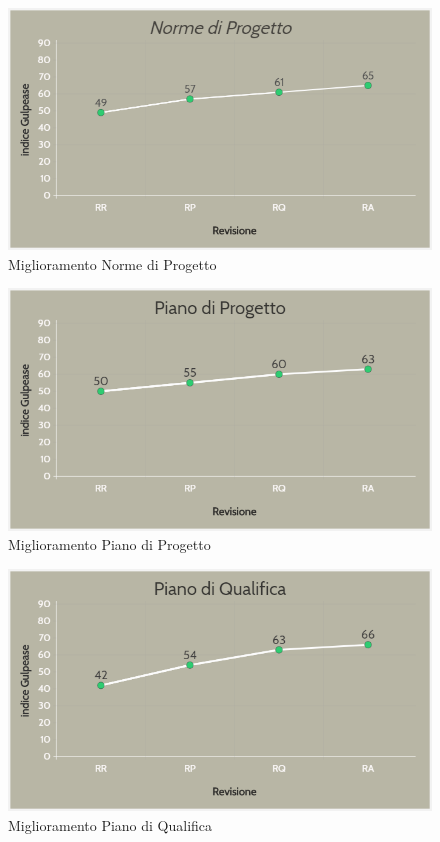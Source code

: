 \begin{figure}[H]
	\centering
	\includegraphics[scale=0.6]{includes/img/NdP.png}
	\caption{Miglioramento Norme di Progetto}
\end{figure}

\begin{figure}[H]
	\centering
	\includegraphics[scale=0.6]{includes/img/PdP.png}
	\caption{Miglioramento Piano di Progetto}
\end{figure}

\begin{figure}[H]
	\centering
	\includegraphics[scale=0.6]{includes/img/PdQ.png}
	\caption{Miglioramento Piano di Qualifica}
\end{figure}

